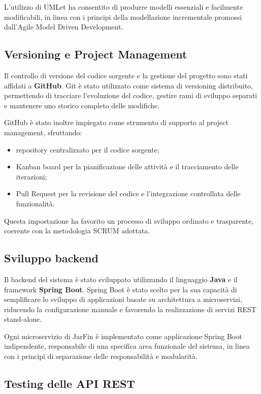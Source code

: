 L’utilizzo di UMLet ha consentito di produrre modelli essenziali e facilmente modificabili, in linea con i principi della modellazione incrementale promossi dall’Agile Model Driven Development.

\subsection{Versioning e Project Management}

Il controllo di versione del codice sorgente e la gestione del progetto sono stati affidati a \textbf{GitHub}.
Git è stato utilizzato come sistema di versioning distribuito, permettendo di tracciare l’evoluzione del codice, gestire rami di sviluppo separati e mantenere uno storico completo delle modifiche.

\newpage

GitHub è stato inoltre impiegato come strumento di supporto al project management, sfruttando:
\begin{itemize}
    \item repository centralizzato per il codice sorgente;
    \item Kanban board per la pianificazione delle attività e il tracciamento delle iterazioni;
    \item Pull Request per la revisione del codice e l’integrazione controllata delle funzionalità.
\end{itemize}

Questa impostazione ha favorito un processo di sviluppo ordinato e trasparente, coerente con la metodologia SCRUM adottata.

\subsection{Sviluppo backend}

Il backend del sistema è stato sviluppato utilizzando il linguaggio \textbf{Java} e il framework \textbf{Spring Boot}.
Spring Boot è stato scelto per la sua capacità di semplificare lo sviluppo di applicazioni basate su architettura a microservizi, riducendo la configurazione manuale e favorendo la realizzazione di servizi REST stand-alone.

Ogni microservizio di JarFin è implementato come applicazione Spring Boot indipendente, responsabile di una specifica area funzionale del sistema, in linea con i principi di separazione delle responsabilità e modularità.

\subsection{Testing delle API REST}

